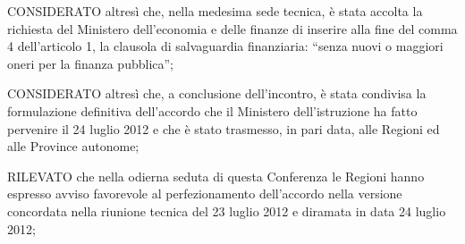 CONSIDERATO altresì che, nella medesima sede tecnica, è stata accolta la richiesta del Ministero dell'economia e delle finanze di inserire alla fine del comma 4 dell'articolo 1, la clausola di salvaguardia finanziaria: “senza nuovi o maggiori oneri per la finanza pubblica”; 

CONSIDERATO altresì che, a conclusione dell'incontro, è stata condivisa la formulazione definitiva dell'accordo che il Ministero dell'istruzione ha fatto pervenire il 24 luglio 2012 e che è stato trasmesso, in pari data, alle Regioni ed alle Province autonome;

RILEVATO che nella odierna seduta di questa Conferenza le Regioni hanno espresso avviso favorevole al perfezionamento dell'accordo nella versione concordata nella riunione tecnica del 23 luglio 2012 e diramata in data 24 luglio 2012;

